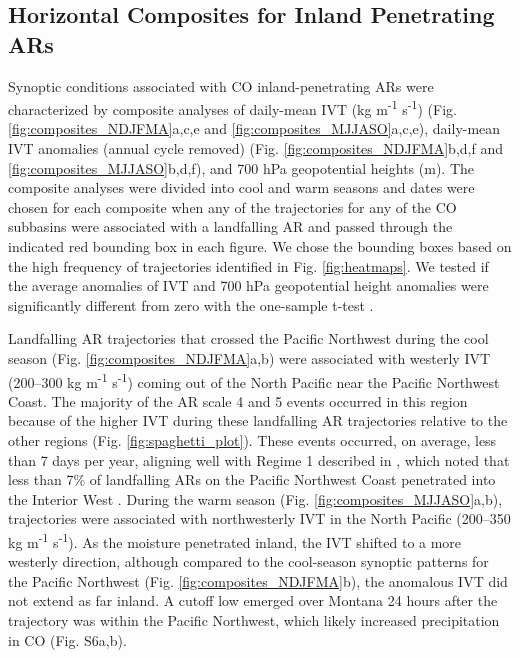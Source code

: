 \documentclass[draft]{agujournal2019}
\begin{document}
\subsection{Horizontal Composites for Inland Penetrating ARs}
\label{sec:results:composite_analysis}

Synoptic conditions associated with CO inland-penetrating ARs were characterized by composite analyses of daily-mean IVT (kg m\textsuperscript{-1} s\textsuperscript{-1}) (Fig. \ref{fig:composites_NDJFMA}a,c,e and \ref{fig:composites_MJJASO}a,c,e), daily-mean IVT anomalies (annual cycle removed) (Fig. \ref{fig:composites_NDJFMA}b,d,f and \ref{fig:composites_MJJASO}b,d,f), and 700 hPa geopotential heights (m). The composite analyses were divided into cool and warm seasons and dates were chosen for each composite when any of the trajectories for any of the CO subbasins were associated with a landfalling AR and passed through the indicated red bounding box in each figure. We chose the bounding boxes based on the high frequency of trajectories identified in Fig. \ref{fig:heatmaps}. We tested if the average anomalies of IVT and 700 hPa geopotential height anomalies were significantly different from zero with the one-sample t-test \cite{WILKS2019ch5statistics}. 


Landfalling AR trajectories that crossed the Pacific Northwest during the cool season (Fig. \ref{fig:composites_NDJFMA}a,b) were associated with westerly IVT (200--300 kg m\textsuperscript{-1} s\textsuperscript{-1}) coming out of the North Pacific near the Pacific Northwest Coast. The majority of the AR scale 4 and 5 events occurred in this region because of the higher IVT during these landfalling AR trajectories relative to the other regions (Fig. \ref{fig:spaghetti_plot}). These events occurred, on average, less than 7 days per year, aligning well with Regime 1 described in , which noted that less than 7\% of landfalling ARs on the Pacific Northwest Coast penetrated into the Interior West \cite{Rutz2015}. During the warm season (Fig. \ref{fig:composites_MJJASO}a,b), trajectories were associated with northwesterly IVT in the North Pacific (200--350 kg m\textsuperscript{-1} s\textsuperscript{-1}). As the moisture penetrated inland, the IVT shifted to a more westerly direction, although compared to the cool-season synoptic patterns for the Pacific Northwest (Fig. \ref{fig:composites_NDJFMA}b), the anomalous IVT did not extend as far inland. A cutoff low emerged  over Montana 24 hours after the trajectory was within the Pacific Northwest, which likely increased precipitation in CO (Fig. S6a,b).
\end{document}
